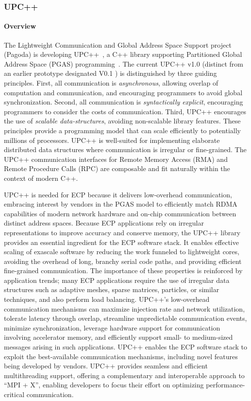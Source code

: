 \subsubsection{ UPC++} 
\paragraph{Overview} 
The Lightweight Communication and Global Address Space Support project (Pagoda)
is developing UPC++~\cite{upcxx-site}, a C++ library
supporting Partitioned Global Address Space (PGAS) programming~\cite{upcxx-ipdps19,upcxx-spec}.
The current UPC++ v1.0 (distinct from an earlier prototype designated V0.1
\cite{zheng:ipdps14}) is distinguished by three guiding principles.
First, all communication is \emph{asynchronous}, allowing overlap of computation and
communication, and encouraging programmers to avoid global synchronization. Second, all communication
is \emph{syntactically explicit}, encouraging programmers to consider the costs of communication. Third,
UPC++ encourages the use of \emph{scalable data-structures},
avoiding non-scalable library features.
These principles provide a programming model that can
scale efficiently to potentially millions of processors.
UPC++ is well-suited for implementing elaborate distributed data structures where
communication is irregular or fine-grained. 
The UPC++ communication interfaces for Remote Memory Access (RMA) 
and Remote Procedure Calls (RPC)
are composable and fit naturally within the context of modern C++.

UPC++ is needed for ECP because it delivers low-overhead communication,
embracing interest by vendors in the PGAS model to
efficiently match RDMA capabilities of modern
network hardware and on-chip communication between distinct address
spaces.  
Because ECP applications rely on irregular representations
to improve accuracy and conserve memory, the UPC++ library provides
an essential ingredient for the ECP software stack.  It enables
effective scaling of exascale software by reducing the work funneled
to lightweight cores, avoiding the overhead of long, branchy serial
code paths, and providing efficient fine-grained communication.  The
importance of these properties is reinforced by application trends;
many ECP applications require the use of irregular data structures such as 
adaptive meshes, sparse
matrices, particles, or similar techniques, and also perform load balancing.  UPC++'s
low-overhead communication mechanisms can maximize injection rate and
network utilization, tolerate latency through overlap, streamline
unpredictable communication events, minimize synchronization,
leverage hardware support for communication involving accelerator memory,
and efficiently support small- to medium-sized messages arising in such
applications.  UPC++ enables the ECP software stack to exploit
the best-available communication mechanisms, including novel features
being developed by vendors.
UPC++ provides seamless and efficient multithreading support,
offering a complementary and
interoperable approach to ``MPI + X'', enabling developers to
focus their effort on optimizing performance-critical communication.

